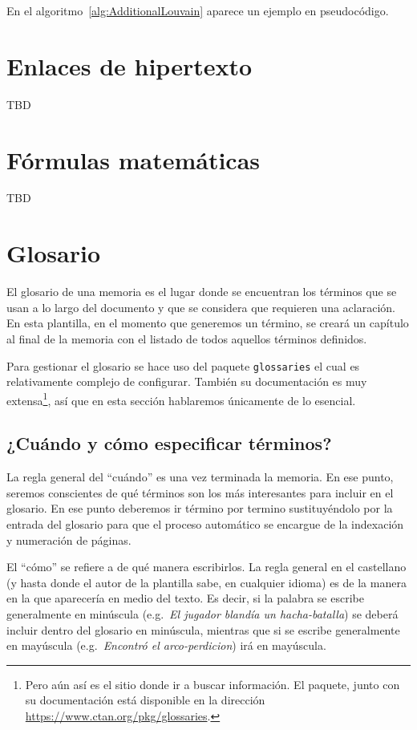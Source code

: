 En el algoritmo~\ref{alg:AdditionalLouvain} aparece un ejemplo en pseudocódigo.

\section{Enlaces de hipertexto}

TBD

\section{Fórmulas matemáticas}

TBD

\section{Glosario}
\label{s:glosario}

El glosario de una memoria es el lugar donde se encuentran los términos que se usan a lo largo del documento y que se considera que requieren una aclaración. En esta plantilla, en el momento que generemos un término, se creará un capítulo al final de la memoria con el listado de todos aquellos términos definidos.

Para gestionar el glosario se hace uso del paquete \texttt{glossaries} el cual es relativamente complejo de configurar. También su documentación es muy extensa\footnote{Pero aún así es el sitio donde ir a buscar información. El paquete, junto con su documentación está disponible en la dirección \href{https://www.ctan.org/pkg/glossaries}{https://www.ctan.org/pkg/glossaries}.}, así que en esta sección hablaremos únicamente de lo esencial.

\subsection{¿Cuándo y cómo especificar términos?}

La regla general del \enquote{cuándo} es una vez terminada la memoria. En ese punto, seremos conscientes de qué términos son los más interesantes para incluir en el glosario. En ese punto deberemos ir término por termino sustituyéndolo por la entrada del glosario para que el proceso automático se encargue de la indexación y numeración de páginas.

El \enquote{cómo} se refiere a de qué manera escribirlos. La regla general en el castellano (y hasta donde el autor de la plantilla sabe, en cualquier idioma) es de la manera en la que aparecería en medio del texto. Es decir, si la palabra se escribe generalmente en minúscula (e.g.~\textit{El jugador blandía un \gls{hacha-batalla}}) se deberá incluir dentro del glosario en minúscula, mientras que si se escribe generalmente en mayúscula (e.g.~\textit{Encontró el \gls{arco-perdicion}}) irá en mayúscula.

